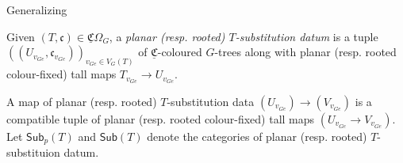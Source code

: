 \documentclass[a4paper,10pt
,draft
]{article}%
\begin{document}
Generalizing \cite[Remark 3.78]{BP17}
\begin{definition}
      Given $(T,\mathfrak c) \in \underline{\mathfrak C}\Omega_G$, a
      \textit{planar (resp. rooted) $T$-substitution datum} is a tuple
      $((U_{v_{Ge}}, \mathfrak c_{v_{Ge}}))_{v_{Ge} \in V_G(T)}$ of $\underline{\mathfrak C}$-coloured $G$-trees along with
      planar (resp. rooted colour-fixed) tall maps
      $T_{v_{Ge}} \to U_{v_{Ge}}$.

      A map of planar (resp. rooted) $T$-substitution data $(U_{v_{Ge}}) \to (V_{v_{Ge}})$ is a compatible tuple of planar (resp. rooted colour-fixed) tall maps $(U_{v_{Ge}} \to V_{v_{Ge}})$.
      Let $\mathsf{Sub}_p(T)$ and $\mathsf{Sub}(T)$ denote the categories of planar (resp. rooted) $T$-substituion datum.
\end{definition}
\end{document}
